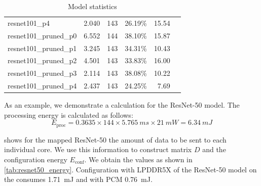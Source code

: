 \begin{table}[]
\begin{tabular}{@{}lrrrrr@{}}
resnet101\_p4           & 2.040                                                           & 143            & 26.19\%            & 15.54                                                             \\
resnet101\_pruned\_p0   & 6.552                                                           & 144            & 38.10\%            & 15.87                                                             \\
resnet101\_pruned\_p1   & 3.245                                                           & 143            & 34.31\%            & 10.43                                                             \\
resnet101\_pruned\_p2   & 4.501                                                           & 143            & 33.83\%            & 16.00                                                             \\
resnet101\_pruned\_p3   & 2.114                                                           & 143            & 38.08\%            & 10.22                                                             \\
resnet101\_pruned\_p4   & 2.437                                                           & 143            & 24.25\%            & 7.69                                                              \\
\bottomrule
\end{tabular}
\caption{Model statistics}
\label{tab:example_models_stats}
\end{table}

As an example, we demonstrate a calculation for the ResNet-50 model.
The processing energy is calculated as follows:
\begin{equation}
    E_\textrm{proc} = 0.3635 \times 144 \times \SI{5.765}{ms} \times \SI{21}{mW} = \SI{6.34}{mJ}
\end{equation}

 shows for the mapped ResNet-50 the amount of data to be sent to each individual core.
We use this information to construct matrix $D$ and the configuration energy $E_\textrm{conf}$.
We obtain the values as shown in \cref{tab:resnet50_energy}.
Configuration with LPDDR5X of the ResNet-50 model on the \graicore{} consumes \SI{1.71}{mJ} and with PCM \SI{0.76}{mJ}.


